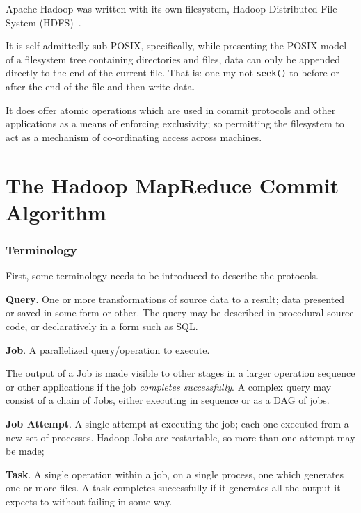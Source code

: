\documentclass[conference]{IEEEtran}
\begin{document}
Apache Hadoop was written with its own filesystem, Hadoop Distributed File System
(HDFS)\ \cite{Chansler2011}.

It is self-admittedly sub-POSIX, specifically, while presenting the POSIX
model of a filesystem tree containing directories and files, data can only be
appended directly to the end of the current file.
That is: one my not \texttt{seek()} to before or after the end of the file and
then write data.

It does offer atomic operations which are used in commit protocols and other
applications as a means of enforcing exclusivity;
so permitting the filesystem to act as a mechanism of co-ordinating access across machines.


\section{The Hadoop MapReduce Commit Algorithm}
\label{sec:commit}


\subsubsection{Terminology}

First, some terminology needs to be introduced to describe
the protocols.



\textbf{Query}.
One or more transformations of source data to a result;
data presented or saved in some form or other.
The query may be described in procedural source code,
or declaratively in a form such as SQL\@.


\textbf{Job}.
A parallelized query/operation to execute.

The output of a Job is made visible to other stages in a larger operation
sequence or other applications if the job \emph{completes successfully}.
A complex query may consist of a chain of Jobs, either executing in sequence
or as a DAG of jobs.

\textbf{Job Attempt}.
A single attempt at executing the job;
each one executed from a new set of processes.
Hadoop Jobs are restartable, so more than one attempt may be made;

\textbf{Task}.
A single operation within a job, on a single process, one which generates
one or more files.
A task completes successfully if it generates all the output it expects to without
failing in some way.
\end{document}

